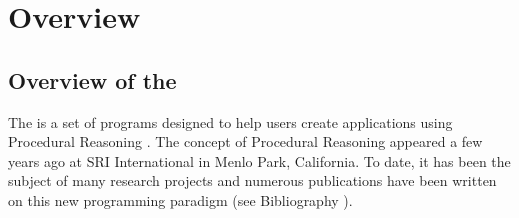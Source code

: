 
\part{Overview}



\chapter*{Overview of the \COPRSDE{}}


The \COPRSDE{} is a set of programs designed to help users create applications using 
Procedural Reasoning \cite{Ingrand-Rao-92}. The concept of
Procedural Reasoning appeared a few years ago at SRI International in Menlo Park,
California. To date, it has been the subject of many research projects and numerous 
publications have been written on this new programming
paradigm (see Bibliography \pageref{bibliography}).

